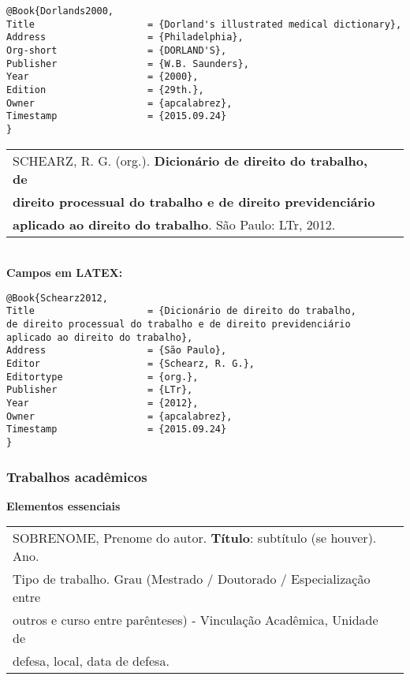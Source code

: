 \begin{verbatim}
@Book{Dorlands2000,
Title                    = {Dorland's illustrated medical dictionary},
Address                  = {Philadelphia},
Org-short                = {DORLAND'S},
Publisher                = {W.B. Saunders},
Year                     = {2000},
Edition                  = {29th.},
Owner                    = {apcalabrez},
Timestamp                = {2015.09.24}
}
\end{verbatim}


\begin{tabular}{|l|c|} \hline
	SCHEARZ, R. G. (org.). \textbf{Dicionário de direito do trabalho, de} \\ \textbf{direito processual do trabalho e de direito previdenciário} \\ \textbf{aplicado ao direito do trabalho}. São Paulo: LTr, 2012.  \\\hline
\end{tabular}\\


\textbf{Campos em LATEX:}

\begin{verbatim}
@Book{Schearz2012,
Title                    = {Dicionário de direito do trabalho, 
de direito processual do trabalho e de direito previdenciário 
aplicado ao direito do trabalho},
Address                  = {São Paulo},
Editor                   = {Schearz, R. G.},
Editortype               = {org.},
Publisher                = {LTr},
Year                     = {2012},
Owner                    = {apcalabrez},
Timestamp                = {2015.09.24}
}
\end{verbatim}

\subsubsection{Trabalhos acadêmicos}

\textbf{Elementos essenciais}\\

\begin{tabular}{|l|c|} \hline
	SOBRENOME, Prenome do autor. \textbf{Título}: subtítulo (se houver). Ano. \\ Tipo de trabalho. Grau (Mestrado / Doutorado / Especialização entre \\ outros e curso entre parênteses) - Vinculação Acadêmica, Unidade de \\ defesa, local, data de defesa.\\\hline
\end{tabular}\\

